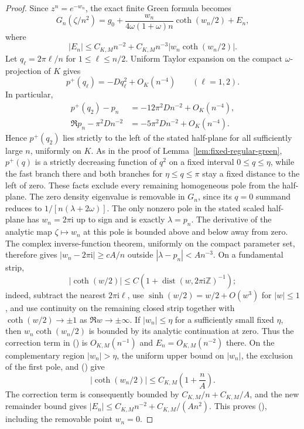 \documentclass[twoside,10pt]{article}
\numberwithin{equation}{section}
\theoremstyle{slbody}
\theoremstyle{definition}
\theoremstyle{remark}
\newcommand{\Z}{\mathbb Z}
\renewcommand{\eqref}[1]{%
  \textup{{\normalfont(\oldstylenums{\ref{#1}}}\normalfont)}}
\begin{document}
\begin{proof}
Since $z^n=e^{-w_n}$, the exact finite Green formula becomes
\begin{equation}\label{eq:fixed-threshold-green-expanded}
 G_n(\zeta/n^2)=g_0+
 \frac{w_n}{4\omega(1+\omega)n}\coth(w_n/2)+E_n,
\end{equation}
where
\[
 |E_n|\le C_{K,M}n^{-2}
       +C_{K,M}n^{-3}|w_n\coth(w_n/2)|.
\]
Let $q_\ell=2\pi\ell/n$ for $1\le\ell\le n/2$.  Uniform Taylor
expansion on the compact $\omega$-projection of $K$ gives
\[
 p^+(q_\ell)=-Dq_\ell^2+O_K(n^{-4})\qquad(\ell=1,2).
\]
In particular,
\begin{align*}
 p^+(q_2)-p_n&=-12\pi^2D n^{-2}+O_K(n^{-4}),\\
 \Re p_n-\pi^2D n^{-2}&=-5\pi^2D n^{-2}+O_K(n^{-4}).
\end{align*}
Hence $p^+(q_2)$ lies strictly to the left of the stated half-plane for
all sufficiently large $n$, uniformly on $K$.  As in the proof of
Lemma~\ref{lem:fixed-regular-green}, $p^+(q)$ is a strictly decreasing
function of $q^2$ on a fixed interval $0\le q\le\eta$, while the fast
branch there and both branches for $\eta\le q\le\pi$ stay a fixed
distance to the left of zero.  These facts exclude every remaining
homogeneous pole from the half-plane.  The zero density eigenvalue is
removable in $G_n$, since its $q=0$ summand reduces to
$1/[n(\lambda+2\omega)]$.
The only nonzero pole in the stated scaled half-plane has
$w_n=2\pi\mathrm i$ up to sign and is exactly $\lambda=p_n$.
The derivative of the analytic map $\zeta\mapsto w_n$ at this pole is
bounded above and below away from zero.  The complex inverse-function
theorem, uniformly on the compact parameter set, therefore gives
$|w_n-2\pi\mathrm i|\ge cA/n$ outside
$|\lambda-p_n|<A n^{-3}$.  On a fundamental strip,
\begin{equation}\label{eq:coth-distance-bound}
 |\coth(w/2)|\le C\left(1+
       \operatorname{dist}(w,2\pi\mathrm i\Z)^{-1}\right);
\end{equation}
indeed, subtract the nearest $2\pi\mathrm i\ell$, use
$\sinh(w/2)=w/2+O(w^3)$ for $|w|\le1$, and use continuity on the
remaining closed strip together with $\coth(w/2)\to\pm1$ as
$\Re w\to\pm\infty$.  If $|w_n|\le\eta$ for a sufficiently small fixed
$\eta$, then $w_n\coth(w_n/2)$ is bounded by its analytic continuation
at zero.  Thus the correction term in
\eqref{eq:fixed-threshold-green-expanded} is $O_{K,M}(n^{-1})$ and
$E_n=O_{K,M}(n^{-2})$ there.  On the complementary region
$|w_n|>\eta$, the uniform upper bound on $|w_n|$, the exclusion of the
first pole, and \eqref{eq:coth-distance-bound} give
\[
 |\coth(w_n/2)|\le C_{K,M}\left(1+\frac nA\right).
\]
The correction term is consequently bounded by
$C_{K,M}/n+C_{K,M}/A$, and the new remainder bound gives
$|E_n|\le C_{K,M}n^{-2}+C_{K,M}/(An^2)$.
This proves \eqref{eq:fixed-bounded-threshold-bound}, including the
removable point $w_n=0$.


\end{proof}
\end{document}

